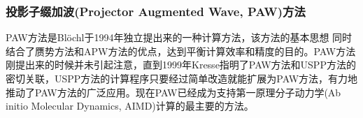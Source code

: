 %
%
%
\subsubsection{投影子缀加波(Projector Augmented Wave, PAW)方法}
PAW方法是\textrm{Bl\"ochl}于1994年独立提出来的一种计算方法\cite{PRB50-17953_1994}，该方法的基本思想%
同时结合了赝势方法和APW方法的优点，达到平衡计算效率和精度的目的。PAW方法刚提出来的时候并未引起注意，直到1999年\textrm{Kresse}指明了PAW方法和USPP方法的密切关联，USPP方法的计算程序只要经过简单改造就能扩展为PAW方法，有力地推动了PAW方法的广泛应用\cite{PRB59-1758_1999}。现在PAW已经成为支持第一原理分子动力学(Ab initio Molecular Dynamics, AIMD)计算的最主要的方法。

